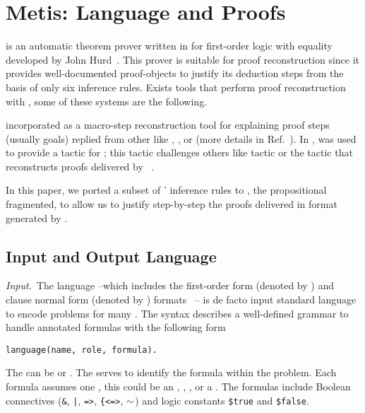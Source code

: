 \documentclass[../main.tex]{subfiles}
\begin{document}

\section{Metis: Language and Proofs}
\label{sec:metis-language-and-proofs}

\Metis is an automatic theorem prover written in  for
first-order logic with equality developed by John Hurd~\cite{hurd2003first}.
This prover is suitable for proof reconstruction since it provides
well-documented proof-objects to justify its deduction steps from the basis
of only six inference rules. Exists tools that perform proof
reconstruction with \Metis, some of these systems are the following.


 incorporated \Metis as a macro-step reconstruction
tool for explaining proof steps (usually \CNF goals) replied from other \ATPs like
, , or 
(more details in Ref.~\cite{paulson2007source}).
In \cite{Farber2015}, \Metis was used to provide a tactic for
; this tactic challenges others like  tactic or the
 tactic that reconstructs proofs delivered by
~\cite{Farber2016}.

In this paper, we ported a subset of \Metis' inference rules to \Agda,
the propositional fragmented, to allow us to justify step-by-step the proofs
delivered in \TSTP format generated by \Metis.


\subsection{Input and Output Language}
\label{ssec:input-and-output-language}

\textit{Input.}~The \TPTP language --which includes the first-order
form (denoted by ) and clause normal form (denoted by )
formats~\cite{sutcliffe2009} -- is de
facto input standard language to encode problems for many \ATPs.
The \TPTP syntax describes a well-defined grammar to handle annotated
formulas with the following form

\begin{verbatim}
language(name, role, formula).
\end{verbatim}

The  can be  or . The 
serves to identify the formula within the problem. Each formula assumes one
, this could be an , ,
, or a . The formulas include Boolean
connectives (\verb!&!, \verb!|!, \verb!=>!, \verb!{<=>!, $\tt\sim$) and logic
constants \verb!$true! and \verb!$false!.
\end{document}
